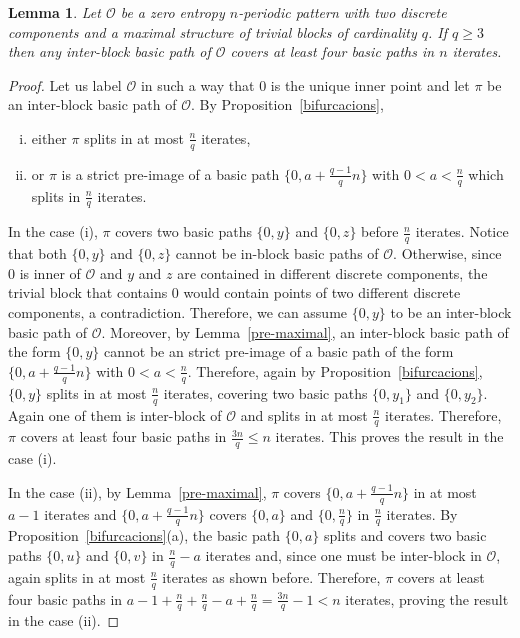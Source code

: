 \documentclass[a4paper]{amsart}
\newtheorem{lemma}[theorem]{Lemma}
\theoremstyle{definition}
\begin{document}
\begin{lemma}\label{cover-k}
Let $\mathcal{O}$ be a zero entropy $n$-periodic pattern with two discrete components and a maximal structure of trivial blocks of cardinality $q$.
If $q\geq 3$ then any inter-block basic path of $\mathcal{O}$ covers at least four basic paths in $n$ iterates.
\end{lemma}
\begin{proof}
Let us label $\mathcal{O}$ in such a way that $0$ is the unique inner point and let $\pi$ be an inter-block basic path of $\mathcal{O}$. By Proposition~\ref{bifurcacions},
\begin{enumerate}[(i)]
\item either $\pi$ splits in at most $\frac{n}{q}$ iterates,
\item or $\pi$ is a strict pre-image of a basic path $\{0,a+\frac{q-1}{q}n\}$ with $0<a<\frac{n}{q}$ which splits in $\frac{n}{q}$ iterates.
\end{enumerate}

In the case (i), $\pi$ covers two basic paths $\{0,y\}$ and $\{0,z\}$ before $\frac{n}{q}$ iterates. Notice that both $\{0,y\}$ and $\{0,z\}$ cannot be in-block basic paths of $\mathcal{O}$. Otherwise, since $0$ is inner of $\mathcal{O}$ and $y$ and $z$ are contained in different discrete components, the trivial block that contains $0$ would contain points of two different discrete components, a contradiction. Therefore, we can assume $\{0,y\}$ to be an inter-block basic path of $\mathcal{O}$. Moreover, by Lemma~\ref{pre-maximal}, an inter-block basic path of the form $\{0,y\}$ cannot be an strict pre-image of a basic path of the form $\{0,a+\frac{q-1}{q}n\}$ with $0<a<\frac{n}{q}$. Therefore, again by Proposition~\ref{bifurcacions}, $\{0,y\}$ splits in at most $\frac{n}{q}$ iterates, covering two basic paths $\{0,y_1\}$ and $\{0,y_2\}$. Again one of them is inter-block of $\mathcal{O}$ and splits in at most $\frac{n}{q}$ iterates. Therefore, $\pi$ covers at least four basic paths in $\frac{3n}{q}\leq n$ iterates. This proves the result in the case (i).

In the case (ii), by Lemma~\ref{pre-maximal}, $\pi$ covers $\{0,a+\frac{q-1}{q}n\}$ in at most $a-1$ iterates and $\{0,a+\frac{q-1}{q}n\}$ covers $\{0,a\}$ and $\{0,\frac{n}{q}\}$ in $\frac{n}{q}$ iterates. By Proposition~\ref{bifurcacions}(a), the basic path $\{0,a\}$ splits and covers two basic paths $\{0,u\}$ and $\{0,v\}$ in $\frac{n}{q}-a$ iterates and, since one must be inter-block in $\mathcal{O}$, again splits in at most $\frac{n}{q}$ iterates as shown before. Therefore, $\pi$ covers at least four basic paths in $a-1+\frac{n}{q}+\frac{n}{q}-a+\frac{n}{q}=\frac{3n}{q}-1<n$ iterates, proving the result in the case (ii).
\end{proof}
\end{document}

